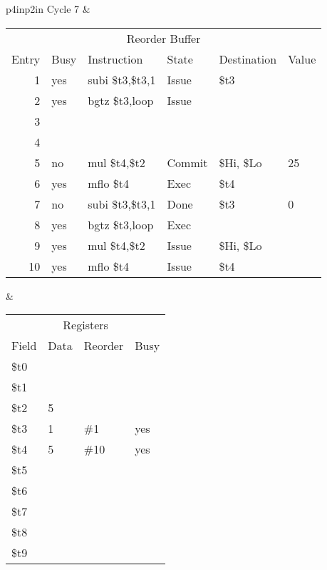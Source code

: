 \noindent
\begin{tabular}{p{4in}p{2in}}
Cycle 7 & \\ \hline \hline

\begin{tabular}{rlp{.9in}lll}
\multicolumn{6}{c}{Reorder Buffer} \\
Entry & Busy & Instruction        & State & Destination & Value \\ \hline
 1    & yes  & subi \$t3,\$t3,1   & Issue & \$t3        &       \\
 2    & yes  & bgtz \$t3,loop     & Issue &             &       \\
 3    &      &                    &       &             &       \\
 4    &      &                    &       &             &       \\
 5    & no   & mul  \$t4,\$t2     & Commit& \$Hi, \$Lo  & 25    \\
 6    & yes  & mflo \$t4          & Exec  & \$t4        &       \\
 7    & no   & subi \$t3,\$t3,1   & Done  & \$t3        & 0     \\
 8    & yes  & bgtz \$t3,loop     & Exec  &             &       \\
 9    & yes  & mul  \$t4,\$t2     & Issue & \$Hi, \$Lo  &       \\
10    & yes  & mflo \$t4          & Issue & \$t4        &       \\
\end{tabular} &

\begin{tabular}{llll}
\multicolumn{4}{c}{Registers} \\
Field & Data & Reorder & Busy \\ \hline
\$t0  &      &         &      \\
\$t1  &      &         &      \\
\$t2  & 5    &         &      \\
\$t3  & 1    & \#1     & yes  \\
\$t4  & 5    & \#10    & yes  \\
\$t5  &      &         &      \\
\$t6  &      &         &      \\
\$t7  &      &         &      \\
\$t8  &      &         &      \\
\$t9  &      &         &      \\
\end{tabular} \\


\end{tabular}
